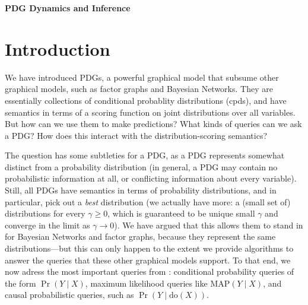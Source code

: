 \documentclass{article}
\theoremstyle{plain}
\theoremstyle{definition}
\theoremstyle{remark}
\newcommand\smid{\!\mid\!}
\newcommand\MAP{\mathrm{MAP}}
\newcommand\ado{\mathrm{do}}
\begin{document}
\begin{center}
	{\bfseries\Large PDG Dynamics and Inference}
\end{center}	
	
\section{Introduction}

We have introduced PDGs, a powerful graphical model that subsume other graphical
models, such as factor graphs and Bayesian Networks. They are essentially 
collections of conditional probablity distributions (cpds), and have semantics in
terms of a scoring function on joint distributions over all variables.
But how can we use them to make predictions? What kinds of queries can we ask a PDG? How does this interact with the distribution-scoring semantics?

The question has some subtleties for a PDG, as a PDG represents somewhat distinct
from a probability distribution (in general, a PDG may contain no probabilistic
information at all, or  conflicting information about every variable).
Still, all PDGs have semantics in terms of probability distributions, and 
in particular, pick out a \emph{best} distribution (we actually have more: a 
(small set of) distributions for every $\gamma \ge 0$, which is guaranteed to 
be unique small $\gamma$ and converge in the limit as $\gamma\to 0$).
We have argued that this allows them to stand in for Bayesian Networks
and factor graphs, because they represent the same distributions---but this
can only happen to the extent we provide algorithms to answer the queries that 
these other graphical models support. To that end, we now adress the most 
important queries from : 
	conditional probability queries of the form $\Pr(Y \smid X)$, 
	maximum likelihood queries like $\MAP(Y \mid X)$, 
	and causal probabilistic queries, such as $\Pr(Y \smid \ado(X))$.
	


\end{document}
